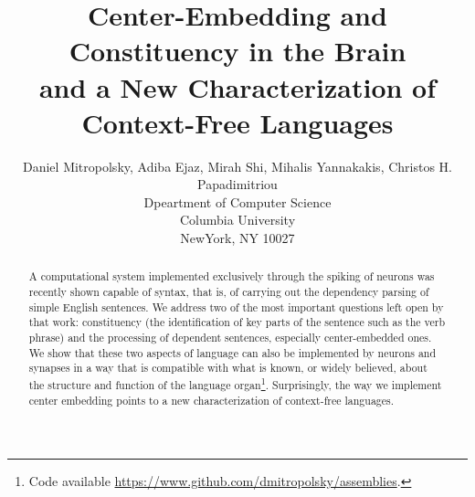 \documentclass[11pt]{article}
\title{Center-Embedding and Constituency in the Brain\\
and a New Characterization of Context-Free Languages}
\author{Daniel Mitropolsky, Adiba Ejaz, Mirah Shi, Mihalis Yannakakis, Christos H. Papadimitriou \\
Dpeartment of Computer Science \\
Columbia University \\
NewYork, NY 10027}
\begin{document}
\maketitle
\begin{abstract}
A computational system implemented exclusively through the spiking of neurons was recently shown capable of syntax, that is, of carrying out the dependency parsing of simple English sentences.  We address two of the most important questions left open by that work: constituency (the identification of key parts of the sentence such as the verb phrase) and the processing of dependent sentences, especially center-embedded ones. We show that these two aspects of language can also be implemented by neurons and synapses in a way that is compatible with what is known, or widely believed, about the structure and function of the language organ\footnote{Code available \url{https://www.github.com/dmitropolsky/assemblies}.}. Surprisingly, the way we implement center embedding points to a new characterization of context-free languages.
\end{abstract}
\end{document}
